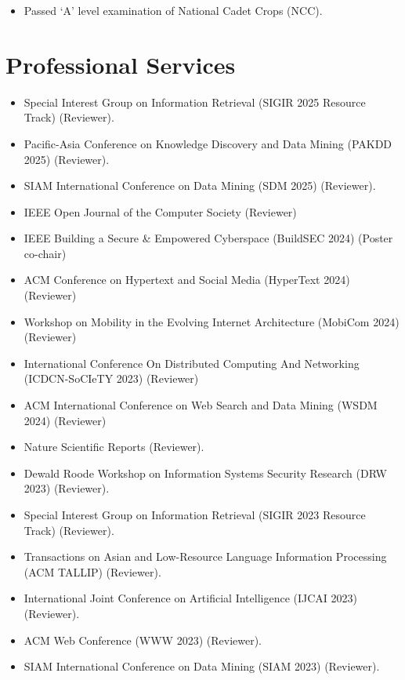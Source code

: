\documentclass[margin, centered,lmodern]{res}
\begin{document}
\begin{resume}
\begin{itemize}[leftmargin=*]
 \item Passed `A' level examination of National Cadet Crops (NCC).
\end{itemize}

\section{Professional Services}
\begin{itemize}[leftmargin=*]
\item Special Interest Group on Information Retrieval (SIGIR 2025 Resource Track) (Reviewer).
\item Pacific-Asia Conference on Knowledge Discovery and Data Mining (PAKDD 2025) (Reviewer).
\item SIAM International Conference on Data Mining (SDM 2025) (Reviewer).
\item IEEE Open Journal of the Computer Society (Reviewer)
\item IEEE Building a Secure & Empowered Cyberspace (BuildSEC 2024) (Poster co-chair)
\item ACM Conference on Hypertext and Social Media (HyperText 2024) (Reviewer)
\item Workshop on Mobility in the Evolving Internet Architecture (MobiCom 2024) (Reviewer)
\item International Conference On Distributed Computing And Networking (ICDCN-SoCIeTY 2023) (Reviewer)
\item ACM International Conference on Web Search and Data Mining (WSDM 2024) (Reviewer)
\item Nature Scientific Reports (Reviewer).
\item Dewald Roode Workshop on Information Systems Security Research (DRW 2023) (Reviewer).
\item Special Interest Group on Information Retrieval (SIGIR 2023 Resource Track) (Reviewer).
\item Transactions on Asian and Low-Resource Language Information Processing (ACM TALLIP) (Reviewer).
\item International Joint Conference on Artificial Intelligence (IJCAI 2023) (Reviewer).
\item ACM Web Conference (WWW 2023) (Reviewer).
\item SIAM International Conference on Data Mining (SIAM 2023) (Reviewer).

\end{itemize}
\end{resume}
\end{document}

